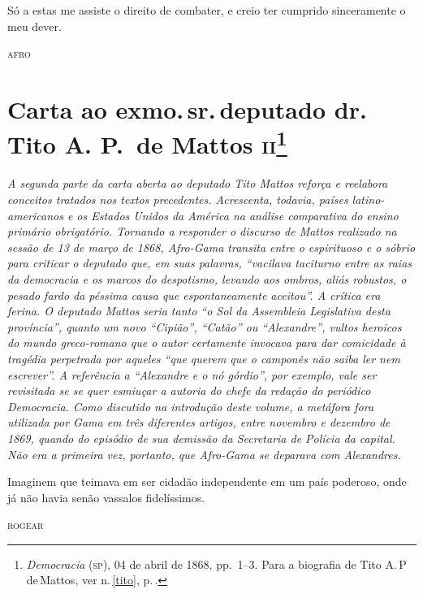Só a estas me assiste o direito de combater, e creio ter cumprido
sinceramente o meu dever.

\begin{flushright}
\textsc{afro}
\end{flushright}

\chapter{Carta ao exmo.\,sr.\,deputado dr.\,Tito A. P.~de Mattos
\textsc{ii}\footnote{\emph{Democracia} (\textsc{sp}), 04 de abril de 1868, pp.~1--3.
  Para a biografia de Tito A.\,P\,de\,Mattos, ver n.\,\ref{tito}, p.\,\pageref{tito}.}}

\begin{didascalia}\itshape
A segunda parte da carta aberta ao deputado Tito Mattos reforça e
reelabora conceitos tratados nos textos precedentes. Acrescenta,
todavia, países latino-americanos e os Estados Unidos da América na
análise comparativa do ensino primário obrigatório. Tornando a responder
o discurso de Mattos realizado na sessão de 13 de março de 1868, Afro-Gama
transita entre o espirituoso e o sóbrio para criticar o deputado que, em
suas palavras, ``vacilava taciturno entre as raias da democracia e
os marcos do despotismo, levando aos ombros, aliás robustos, o pesado
fardo da péssima causa que espontaneamente aceitou''. A crítica era
ferina. O deputado Mattos seria tanto ``o Sol da Assembleia Legislativa
desta província'', quanto um novo ``Cipião'', ``Catão'' ou ``Alexandre'',
vultos heroicos do mundo greco-romano que o autor certamente invocava
para dar comicidade à tragédia perpetrada por aqueles ``que querem que o
camponês não saiba ler nem escrever''. A referência a ``Alexandre e o nó
górdio'', por exemplo, vale ser revisitada se se quer esmiuçar a autoria
do chefe da redação do periódico \textnormal{Democracia}. Como discutido na
introdução deste volume, a metáfora fora utilizada por Gama em três
diferentes artigos, entre novembro e dezembro de 1869, quando do
episódio de sua demissão da Secretaria de Polícia da capital. Não era a
primeira vez, portanto, que Afro-Gama se deparava com
Alexandres.
\end{didascalia}



\epigraph{Imaginem que teimava em ser cidadão independente em um país poderoso,
onde já não havia senão vassalos fidelíssimos.}{\textsc{rogear}\footnotemark}


